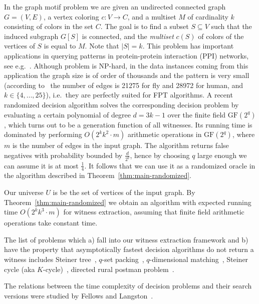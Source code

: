 \documentclass[11pt]{article}
\newcommand{\field}[1]{{\textrm{GF}}({#1})}
\begin{document}
In the graph motif problem we are given an undirected connected graph $G = (V, E)$, a vertex coloring $c:V\rightarrow C$, and a multiset $M$ of cardinality $k$ consisting of colors in the set $C$. The goal is to find a subset $S\subseteq V$ such that the induced subgraph $G[S]$ is connected, and the {\em multiset} $c(S)$ of colors of the vertices of $S$ is equal to $M$. Note that $|S|=k$. 
This problem has important applications in querying patterns in protein-protein interaction (PPI) networks, see e.g.~\cite{BrucknerRECOMB09}.
Although problem is NP-hard, in the data instances coming from this application the graph size is of order of thousands and the pattern is very small (according to~\cite{BrucknerRECOMB09} the number of edges is 21275 for fly and 28972 for human, and $k\in\{4,\ldots,25\}$), i.e.\ they are perfectly suited for FPT algorithms.
A recent randomized decision algorithm \cite{BjorklundKaskiKowalik2013} solves the corresponding decision problem by evaluating a certain polynomial of degree $d=3k-1$ over the finite field $\field{2^q}$, which turns out to be a generation function of all witnesses.
Its running time is dominated by performing $O(2^kk^2\cdot m)$ arithmetic operations in $\field{2^q}$, where $m$ is the number 
of edges in the input graph. The algorithm returns false negatives with probability bounded by $\frac{d}{2^q}$, hence by choosing $q$ large enough we can assume it is at most $\frac{1}4$. It follows that we can use it as a randomized oracle in the algorithm described in Theorem~\ref{thm:main-randomized}.

Our universe $U$ is be the set of vertices of the input graph. By Theorem~\ref{thm:main-randomized} we obtain an algorithm with expected running time 
$O(2^kk^3\cdot m)$ for witness extraction, assuming that finite field arithmetic operations take constant time.

The list of problems which a) fall into our witness extraction framework and b) have the property that asymptotically fastest decision algorithms do not return a witness includes Steiner tree~\cite{jesper-st}, $q$-set packing~\cite{BjorklundHusfeldtKaskiKoivisto2010}, $q$-dimensional matching~\cite{BjorklundHusfeldtKaskiKoivisto2010}, Steiner cycle (aka $K$-cycle)~\cite{BjorklundHusfeldtTaslaman2012,Wahlstrom2013}, directed rural postman problem~\cite{Wahlstrom+2013}.

The relations between the time complexity of decision problems and their search versions were studied by Fellows and Langston~\cite{FellowsL:STOC89}.
\end{document}
